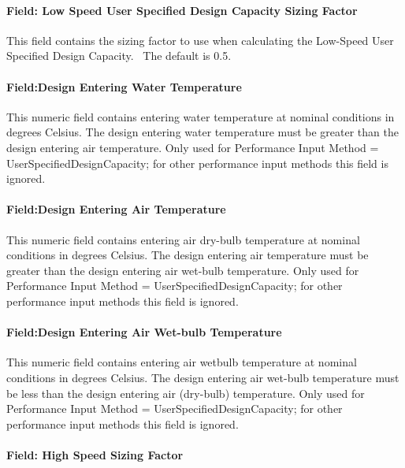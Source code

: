 \paragraph{Field: Low Speed User Specified Design Capacity Sizing Factor}\label{field-low-speed-user-specified-design-capacity-sizing-factor}

This field contains the sizing factor to use when calculating the Low-Speed User Specified Design Capacity.~ The default is 0.5.

\paragraph{Field:Design Entering Water Temperature}\label{fielddesign-entering-water-temperature-1}

This numeric field contains entering water temperature at nominal conditions in degrees Celsius. The design entering water temperature must be greater than the design entering air temperature. Only used for Performance Input Method = UserSpecifiedDesignCapacity; for other performance input methods this field is ignored.

\paragraph{Field:Design Entering Air Temperature}\label{fielddesign-entering-air-temperature-1}

This numeric field contains entering air dry-bulb temperature at nominal conditions in degrees Celsius. The design entering air temperature must be greater than the design entering air wet-bulb temperature. Only used for Performance Input Method = UserSpecifiedDesignCapacity; for other performance input methods this field is ignored.

\paragraph{Field:Design Entering Air Wet-bulb Temperature}\label{fielddesign-entering-air-wet-bulb-temperature-1}

This numeric field contains entering air wetbulb temperature at nominal conditions in degrees Celsius. The design entering air wet-bulb temperature must be less than the design entering air (dry-bulb) temperature. Only used for Performance Input Method = UserSpecifiedDesignCapacity; for other performance input methods this field is ignored.

\paragraph{Field: High Speed Sizing Factor}\label{field-high-speed-sizing-factor}

